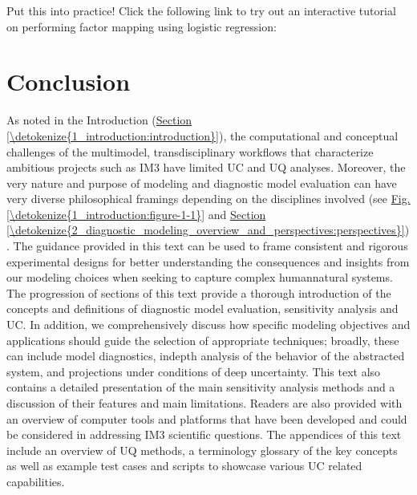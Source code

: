 \documentclass[a4paper,10pt,english]{book}
\begin{document}
\nopagebreak


\sphinxAtStartPar
Put this into practice! Click the following link to try out an interactive tutorial on performing factor mapping using logistic regression:

\sphinxAtStartPar
{}




\chapter{Conclusion}
\label{\detokenize{5_conclusion:conclusion}}\label{\detokenize{5_conclusion:id1}}\label{\detokenize{5_conclusion::doc}}
\sphinxAtStartPar
As noted in the Introduction (\hyperref[\detokenize{1_introduction:introduction}]{Section \ref{\detokenize{1_introduction:introduction}}}), the computational and conceptual challenges of the multi\sphinxhyphen{}model, transdisciplinary workflows that characterize ambitious projects such as IM3 have limited UC and UQ analyses. Moreover, the very nature and purpose of modeling and diagnostic model evaluation can have very diverse philosophical framings depending on the disciplines involved (see \hyperref[\detokenize{1_introduction:figure-1-1}]{Fig.\@ \ref{\detokenize{1_introduction:figure-1-1}}} and \hyperref[\detokenize{2_diagnostic_modeling_overview_and_perspectives:perspectives}]{Section \ref{\detokenize{2_diagnostic_modeling_overview_and_perspectives:perspectives}}}). The guidance provided in this text can be used to frame consistent and rigorous experimental designs for better understanding the consequences and insights from our modeling choices when seeking to capture complex human\sphinxhyphen{}natural systems. The progression of sections of this text provide a thorough introduction of the concepts and definitions of diagnostic model evaluation, sensitivity analysis and UC. In addition, we comprehensively discuss how specific modeling objectives and applications should guide the selection of appropriate techniques; broadly, these can include model diagnostics, in\sphinxhyphen{}depth analysis of the behavior of the abstracted system, and projections under conditions of deep uncertainty. This text also contains a detailed presentation of the main sensitivity analysis methods and a discussion of their features and main limitations. Readers are also provided with an overview of computer tools and platforms that have been developed and could be considered in addressing IM3 scientific questions. The appendices of this text include an overview of UQ methods, a terminology glossary of the key concepts as well as example test cases and scripts to showcase various UC related capabilities.
\end{document}
